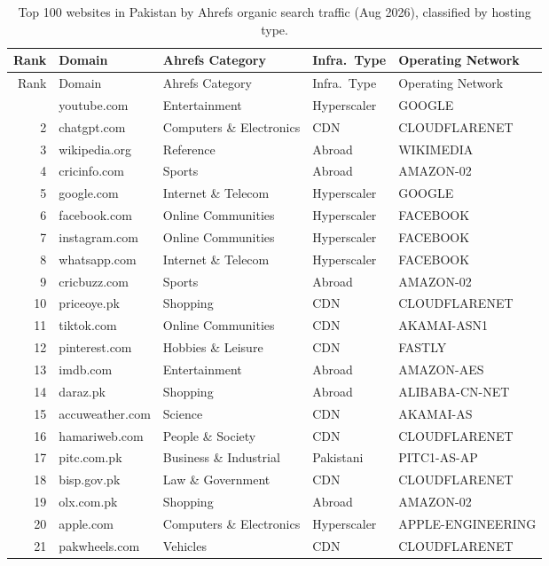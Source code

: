 \documentclass{article}
\begin{document}
\begin{longtable}{r l l l l}
\caption{Top 100 websites in Pakistan by Ahrefs organic search traffic (Aug 2026), classified by hosting type.} \label{tab:ahrefs_pk100} \\
\toprule
Rank & Domain & Ahrefs Category & Infra.\ Type & Operating Network \\
\midrule
\endfirsthead
\toprule
Rank & Domain & Ahrefs Category & Infra.\ Type & Operating Network \\
\midrule
\endhead
\bottomrule
\endfoot
1 & youtube.com & Entertainment & Hyperscaler & GOOGLE \\
2 & chatgpt.com & Computers \& Electronics & CDN & CLOUDFLARENET \\
3 & wikipedia.org & Reference & Abroad & WIKIMEDIA \\
4 & cricinfo.com & Sports & Abroad & AMAZON-02 \\
5 & google.com & Internet \& Telecom & Hyperscaler & GOOGLE \\
6 & facebook.com & Online Communities & Hyperscaler & FACEBOOK \\
7 & instagram.com & Online Communities & Hyperscaler & FACEBOOK \\
8 & whatsapp.com & Internet \& Telecom & Hyperscaler & FACEBOOK \\
9 & cricbuzz.com & Sports & Abroad & AMAZON-02 \\
10 & priceoye.pk & Shopping & CDN & CLOUDFLARENET \\
11 & tiktok.com & Online Communities & CDN & AKAMAI-ASN1 \\
12 & pinterest.com & Hobbies \& Leisure & CDN & FASTLY \\
13 & imdb.com & Entertainment & Abroad & AMAZON-AES \\
14 & daraz.pk & Shopping & Abroad & ALIBABA-CN-NET \\
15 & accuweather.com & Science & CDN & AKAMAI-AS \\
16 & hamariweb.com & People \& Society & CDN & CLOUDFLARENET \\
17 & pitc.com.pk & Business \& Industrial & Pakistani & PITC1-AS-AP \\
18 & bisp.gov.pk & Law \& Government & CDN & CLOUDFLARENET \\
19 & olx.com.pk & Shopping & Abroad & AMAZON-02 \\
20 & apple.com & Computers \& Electronics & Hyperscaler & APPLE-ENGINEERING \\
21 & pakwheels.com & Vehicles & CDN & CLOUDFLARENET \\

\end{longtable}
\end{document}
